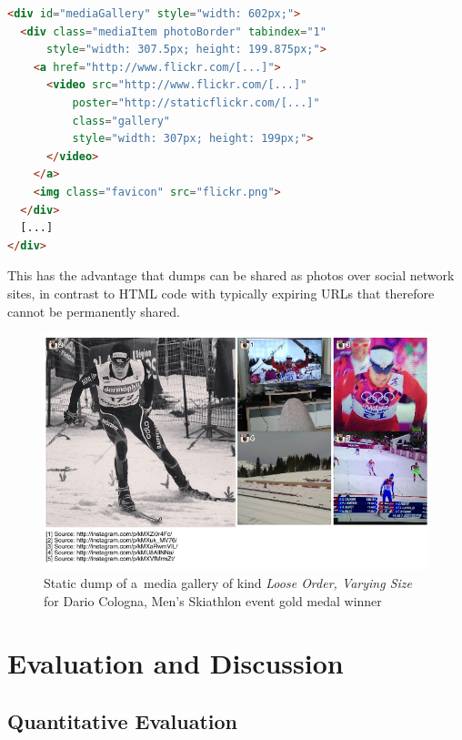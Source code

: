 \documentclass{sig-alternate}
\begin{document}
\begin{lstlisting}[caption={Simplified \emph{Strict Order, Equal Size}
  HTML code}, label=code:mediagalleryhtml, language=HTML]
<div id="mediaGallery" style="width: 602px;">
  <div class="mediaItem photoBorder" tabindex="1"
      style="width: 307.5px; height: 199.875px;">
    <a href="http://www.flickr.com/[...]">
      <video src="http://www.flickr.com/[...]"
          poster="http://staticflickr.com/[...]"
          class="gallery"
          style="width: 307px; height: 199px;">
      </video>
    </a>
    <img class="favicon" src="flickr.png">
  </div>
  [...]
</div>
\end{lstlisting}

This has the advantage that dumps
can be shared as photos over social network sites,
in contrast to  HTML code with typically expiring URLs
that therefore cannot be permanently shared.

\begin{figure}
  \centering
  \includegraphics[width=1.0\columnwidth]{figures/dario_cologna/mediagallery_looseOrder_1391945454845.png}
  \caption{Static dump of a~media gallery of kind \emph{Loose Order, Varying Size}
  for Dario Cologna, Men's Skiathlon event gold medal winner}
  \label{fig:dario-cologna}    
\end{figure}


\section{Evaluation and Discussion}
\label{sec:evaluation-and-discussion}
\selectfont

\subsection{Quantitative Evaluation}
\end{document}
